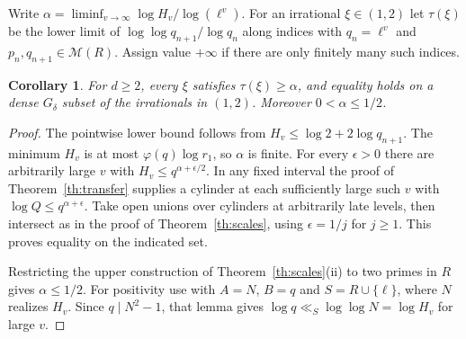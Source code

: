 \documentclass[11pt]{article}
\newtheorem{corollary}[theorem]{Corollary}
\newcommand{\M}{\mathcal M}
\begin{document}
Write $\alpha=\liminf_{v\to\infty}\log H_v/\log(\ell^v)$.
For an irrational $\xi\in(1,2)$ let $\tau(\xi)$ be the lower limit
of $\log\log q_{n+1}/\log q_n$ along indices with $q_n=\ell^v$
and $p_n,q_{n+1}\in\M(R)$. Assign value $+\infty$ if there are only
finitely many such indices.

\begin{corollary}\label{cor:liminf}
For $d\ge2$, every $\xi$ satisfies $\tau(\xi)\ge\alpha$, and equality
holds on a dense $G_\delta$ subset of the irrationals in $(1,2)$.
Moreover $0<\alpha\le1/2$.
\end{corollary}
\begin{proof}
The pointwise lower bound follows from $H_v\le\log2+2\log q_{n+1}$.
The minimum $H_v$ is at most $\varphi(q)\log r_1$, so $\alpha$ is finite.
For every $\epsilon>0$ there are arbitrarily large $v$ with
$H_v\le q^{\alpha+\epsilon/2}$. In any fixed interval the proof of
Theorem~\ref{th:transfer} supplies a cylinder at each sufficiently
large such $v$ with $\log Q\le q^{\alpha+\epsilon}$. Take open unions
over cylinders at arbitrarily late levels, then intersect as in the
proof of Theorem~\ref{th:scales}, using $\epsilon=1/j$ for $j\ge1$.
This proves equality on the indicated set.

Restricting the upper construction of Theorem~\ref{th:scales}(ii) to
two primes in $R$ gives $\alpha\le1/2$. For positivity use
\cite[Lemma 2.2]{marques} with $A=N$, $B=q$ and
$S=R\cup\{\ell\}$, where $N$ realizes $H_v$. Since $q\mid N^2-1$,
that lemma gives $\log q\ll_S\log\log N=\log H_v$ for large $v$.
\end{proof}
\end{document}
